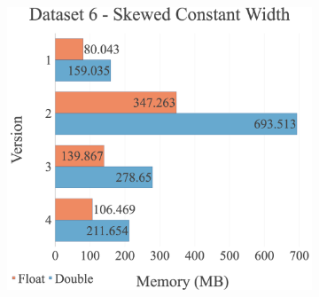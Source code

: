 \begin{figure}[H]
\begin{adjustwidth}{-2cm}{-2cm}
\begin{subfigure}{.62\textwidth}
\end{subfigure}
\par\bigskip
\par\bigskip
\centering
\begin{subfigure}{.62\textwidth}
  \includegraphics[width=1\textwidth]{img/experiments/mem-option-versions-6_SKEWEDCONSTWIDTH.png}
\end{subfigure}
\end{adjustwidth}
\end{figure}

